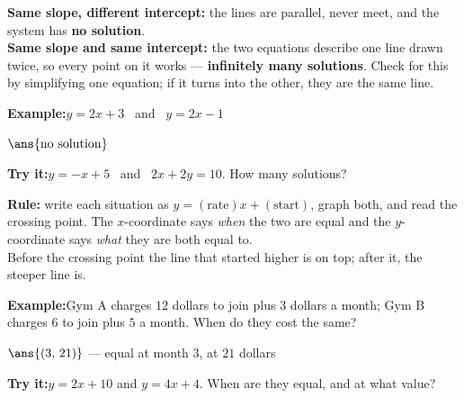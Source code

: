 \documentclass[12pt]{article}
\begin{document}
\begin{formulabox}
\textbf{Same slope, different intercept:} the lines are parallel, never meet,
and the system has \textbf{no solution}.\\[3pt]
\textbf{Same slope and same intercept:} the two equations describe one line
drawn twice, so every point on it works --- \textbf{infinitely many solutions}.
Check for this by simplifying one equation; if it turns into the other, they
are the same line.
\end{formulabox}
\begin{examplebox}
\textbf{Example:}\quad $y = 2x + 3$ \ and \ $y = 2x - 1$

$\ans{\text{no solution}}$
\end{examplebox}
\begin{tryitbox}
\textbf{Try it:}\quad $y = -x + 5$ \ and \ $2x + 2y = 10$. How many solutions?\\[2pt]
\end{tryitbox}

\begin{formulabox}
\textbf{Rule:} write each situation as $y = (\text{rate})x + (\text{start})$,
graph both, and read the crossing point. The $x$-coordinate says \emph{when}
the two are equal and the $y$-coordinate says \emph{what} they are both equal
to.\\[3pt]
Before the crossing point the line that started higher is on top; after it, the
steeper line is.
\end{formulabox}
\begin{examplebox}
\textbf{Example:}\quad Gym A charges $12$ dollars to join plus $3$ dollars a
month; Gym B charges $6$ to join plus $5$ a month. When do they cost the same?

$\ans{(3,\, 21)}$ --- equal at month $3$, at $21$ dollars
\end{examplebox}
\begin{tryitbox}
\textbf{Try it:}\quad $y = 2x + 10$ and $y = 4x + 4$. When are they equal, and
at what value?\\[2pt]
\end{tryitbox}
\end{document}
